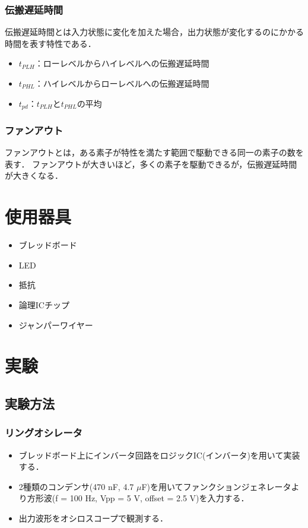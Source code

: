 \documentclass{ltjsarticle}
\begin{document}
\subsubsection{伝搬遅延時間}
伝搬遅延時間とは入力状態に変化を加えた場合，出力状態が変化するのにかかる時間を表す特性である．
\begin{itemize}
  \item ${t_{PLH}}$：ローレベルからハイレベルへの伝搬遅延時間
  \item ${t_{PHL}}$：ハイレベルからローレベルへの伝搬遅延時間
  \item ${t_{pd}}$：${t_{PLH}}$と${t_{PHL}}$の平均
\end{itemize}

\subsubsection{ファンアウト}
ファンアウトとは，ある素子が特性を満たす範囲で駆動できる同一の素子の数を表す．
ファンアウトが大きいほど，多くの素子を駆動できるが，伝搬遅延時間が大きくなる．


\section{使用器具}
\begin{itemize}
  \item ブレッドボード
  \item LED
  \item 抵抗
  \item 論理ICチップ
  \item ジャンパーワイヤー
\end{itemize}

\section{実験}
\subsection{実験方法}
\subsubsection{リングオシレータ}
\begin{itemize}
  \item ブレッドボード上にインバータ回路をロジックIC(インバータ)を用いて実装する．
  \item 2種類のコンデンサ(470 nF, 4.7 $\mu$F)を用いてファンクションジェネレータより方形波(f = 100 Hz, Vpp = 5 V, offset = 2.5 V)を入力する．
  \item 出力波形をオシロスコープで観測する．
\end{itemize}
\end{document}
